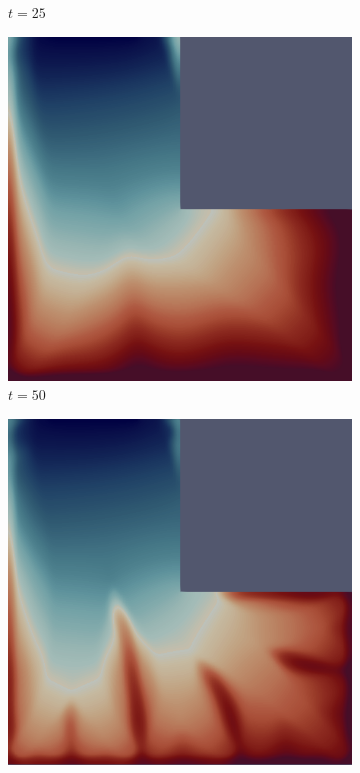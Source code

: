 \begin{figure}[H]
\begin{subfigure}{.4\textwidth}
        \caption{$t = 25$}
    \end{subfigure}
    \begin{subfigure}{.4\textwidth}
        \includegraphics[width=\textwidth]{imgs/LShape_Solution/third.png}
        \caption{$t = 50$}
    \end{subfigure}
    \begin{subfigure}{.4\textwidth}
        \includegraphics[width=\textwidth]{imgs/LShape_Solution/fourth.png}

\end{subfigure}
\end{figure}
